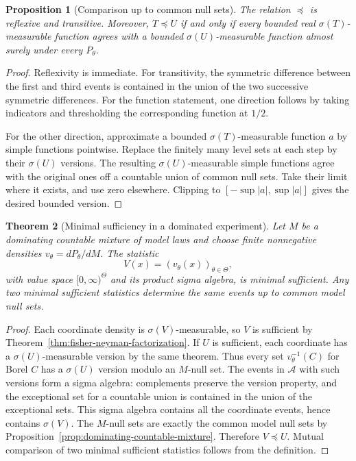 \documentclass[11pt,oneside]{book}
\newtheorem{theorem}{Theorem}[chapter]
\newtheorem{proposition}[theorem]{Proposition}
\theoremstyle{definition}
\theoremstyle{remark}
\begin{document}
\begin{proposition}[Comparison up to common null sets]
\label{prop:statistic-comparison-versions}
The relation $\preceq$ is reflexive and transitive. Moreover,
$T\preceq U$ if and only if every bounded real $\sigma(T)$-measurable
function agrees with a bounded $\sigma(U)$-measurable function
almost surely under every $P_\theta$.
\end{proposition}
\begin{proof}
Reflexivity is immediate. For transitivity, the symmetric difference
between the first and third events is contained in the union of
the two successive symmetric differences. For the function statement,
one direction follows by taking indicators and thresholding the
corresponding function at $1/2$.

For the other direction, approximate a bounded $\sigma(T)$-measurable
function $a$ by simple functions pointwise. Replace the finitely many
level sets at each step by their $\sigma(U)$ versions. The resulting
$\sigma(U)$-measurable simple functions agree with the original ones
off a countable union of common null sets. Take their limit where it
exists, and use zero elsewhere. Clipping to $[-\sup|a|,\sup|a|]$
gives the desired bounded version.
\end{proof}

\begin{theorem}[Minimal sufficiency in a dominated experiment]
\label{thm:minimal-sufficient-density-profile}
Let $M$ be a dominating countable mixture of model laws and choose
finite nonnegative densities $v_\theta=dP_\theta/dM$. The statistic
\[
V(x)=(v_\theta(x))_{\theta\in\Theta},
\]
with value space $[0,\infty)^\Theta$ and its product sigma algebra,
is minimal sufficient. Any two minimal sufficient statistics
determine the same events up to common model null sets.
\end{theorem}
\begin{proof}
Each coordinate density is $\sigma(V)$-measurable, so $V$ is sufficient
by Theorem~\ref{thm:fisher-neyman-factorization}. If $U$ is sufficient,
each coordinate has a $\sigma(U)$-measurable version by the same
theorem. Thus every set $v_\theta^{-1}(C)$ for Borel $C$ has a
$\sigma(U)$ version modulo an $M$-null set. The events in $\mathcal A$
with such versions form a sigma algebra: complements preserve the
version property, and the exceptional set for a countable union is
contained in the union of the exceptional sets. This sigma algebra
contains all the coordinate events, hence contains $\sigma(V)$.
The $M$-null sets are exactly the common model null sets by
Proposition~\ref{prop:dominating-countable-mixture}. Therefore
$V\preceq U$. Mutual comparison of two minimal sufficient statistics
follows from the definition.
\end{proof}
\end{document}
